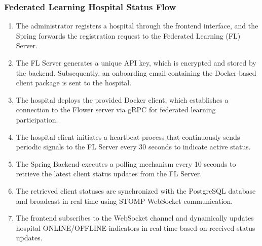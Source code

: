 \subsubsection{Federated Learning Hospital Status Flow}
\begin{enumerate}
	\item The administrator registers a hospital through the frontend interface, and the Spring forwards the registration request to the Federated Learning (FL) Server.
	
	\item The FL Server generates a unique API key, which is encrypted and stored by the backend. Subsequently, an onboarding email containing the Docker-based client package is sent to the hospital.
	
	\item The hospital deploys the provided Docker client, which establishes a connection to the Flower server via gRPC for federated learning participation.
	
	\item The hospital client initiates a heartbeat process that continuously sends periodic signals to the FL Server every 30 seconds to indicate active status.
	
	\item The Spring Backend executes a polling mechanism every 10 seconds to retrieve the latest client status updates from the FL Server.
	
	\item The retrieved client statuses are synchronized with the PostgreSQL database and broadcast in real time using STOMP WebSocket communication.
	
	\item The frontend subscribes to the WebSocket channel and dynamically updates hospital ONLINE/OFFLINE indicators in real time based on received status updates.
\end{enumerate}
